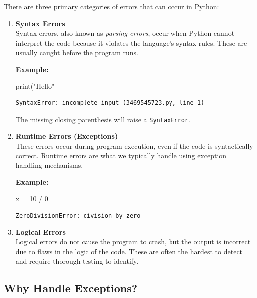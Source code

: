 \documentclass[
  letterpaper,
  DIV=11,
  numbers=noendperiod]{scrreprt}
\newenvironment{Shaded}{\begin{snugshade}}{\end{snugshade}}
\newcommand{\BuiltInTok}[1]{\textcolor[rgb]{0.00,0.23,0.31}{#1}}
\newcommand{\DecValTok}[1]{\textcolor[rgb]{0.68,0.00,0.00}{#1}}
\newcommand{\NormalTok}[1]{\textcolor[rgb]{0.00,0.23,0.31}{#1}}
\newcommand{\OperatorTok}[1]{\textcolor[rgb]{0.37,0.37,0.37}{#1}}
\newcommand{\StringTok}[1]{\textcolor[rgb]{0.13,0.47,0.30}{#1}}
\begin{document}
There are three primary categories of errors that can occur in Python:

\begin{enumerate}
\def\labelenumi{\arabic{enumi}.}
\item
  \textbf{Syntax Errors}\\
  Syntax errors, also known as \emph{parsing errors}, occur when Python
  cannot interpret the code because it violates the language's syntax
  rules. These are usually caught before the program runs.

  \textbf{Example:}

\begin{Shaded}
\begin{Highlighting}[]
\BuiltInTok{print}\NormalTok{(}\StringTok{"Hello"}
\end{Highlighting}
\end{Shaded}

\begin{verbatim}
SyntaxError: incomplete input (3469545723.py, line 1)
\end{verbatim}

  The missing closing parenthesis will raise a \texttt{SyntaxError}.
\item
  \textbf{Runtime Errors (Exceptions)}\\
  These errors occur during program execution, even if the code is
  syntactically correct. Runtime errors are what we typically handle
  using exception handling mechanisms.

  \textbf{Example:}

\begin{Shaded}
\begin{Highlighting}[]
\NormalTok{x }\OperatorTok{=} \DecValTok{10} \OperatorTok{/} \DecValTok{0}  
\end{Highlighting}
\end{Shaded}

\begin{verbatim}
ZeroDivisionError: division by zero
\end{verbatim}
\item
  \textbf{Logical Errors}\\
  Logical errors do not cause the program to crash, but the output is
  incorrect due to flaws in the logic of the code. These are often the
  hardest to detect and require thorough testing to identify.
\end{enumerate}

\hypertarget{why-handle-exceptions}{%
\subsection{Why Handle Exceptions?}\label{why-handle-exceptions}}
\end{document}
